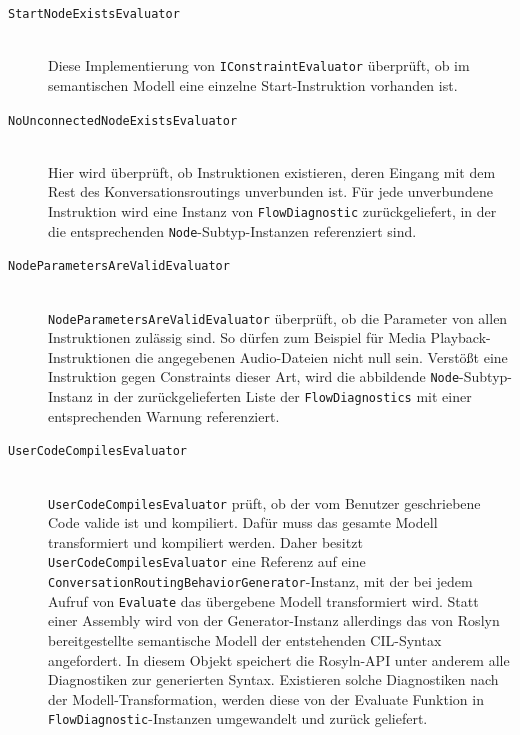 \begin{description}
\item[\texttt{StartNodeExistsEvaluator}] \hfill \\
Diese Implementierung von \texttt{IConstraintEvaluator} überprüft, ob im semantischen Modell eine einzelne Start-Instruktion vorhanden ist.
\item[\texttt{NoUnconnectedNodeExistsEvaluator}] \hfill \\
Hier wird überprüft, ob Instruktionen existieren, deren Eingang mit dem Rest des Konversationsroutings unverbunden ist. Für jede unverbundene Instruktion wird eine Instanz von \texttt{FlowDiagnostic} zurückgeliefert, in der die entsprechenden \texttt{Node}-Subtyp-Instanzen referenziert sind.
\item[\texttt{NodeParametersAreValidEvaluator}] \hfill \\
\texttt{NodeParametersAreValidEvaluator} überprüft, ob die Parameter von allen Instruktionen zulässig sind. So dürfen zum Beispiel für Media Playback-Instruktionen die angegebenen Audio-Dateien nicht null sein. Verstößt eine Instruktion gegen Constraints dieser Art, wird die abbildende \texttt{Node}-Subtyp-Instanz in der zurückgelieferten Liste der \texttt{FlowDiagnostics} mit einer entsprechenden Warnung referenziert.
\item[\texttt{UserCodeCompilesEvaluator}] \hfill \\
\texttt{UserCodeCompilesEvaluator} prüft, ob der vom Benutzer geschriebene Code valide ist und kompiliert. Dafür muss das gesamte Modell transformiert und kompiliert werden. Daher besitzt \texttt{UserCodeCompilesEvaluator} eine Referenz auf eine \texttt{ConversationRoutingBehaviorGenerator}-Instanz, mit der bei jedem Aufruf von \texttt{Evaluate} das übergebene Modell transformiert wird. Statt einer Assembly wird von der Generator-Instanz allerdings das von Roslyn bereitgestellte semantische Modell der entstehenden CIL-Syntax angefordert. In diesem Objekt speichert die Rosyln-API unter anderem alle Diagnostiken zur generierten Syntax. Existieren solche Diagnostiken nach der Modell-Transformation, werden diese von der Evaluate Funktion in \texttt{FlowDiagnostic}-Instanzen umgewandelt und zurück geliefert.
\end{description}
